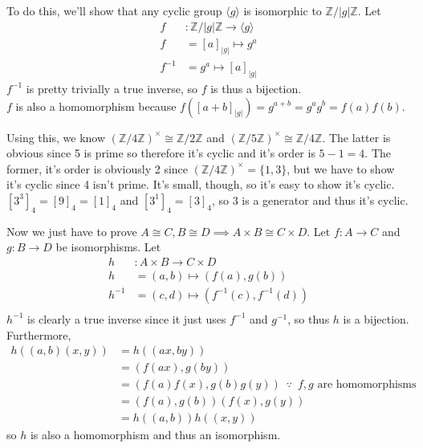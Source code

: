 \documentclass[fleqn]{article}
\begin{document}
        To do this, we'll show that any cyclic group $\langle g \rangle$ is isomorphic to $\mathbb{Z}/|g|\mathbb{Z}$.  Let
        \begin{align}
            f&: \mathbb{Z}/|g|\mathbb{Z} \to \langle g \rangle \\
            f &= [a]_{|g|} \mapsto g^a \\
            f^{-1} &= g^a \mapsto [a]_{|g|}
        \end{align}
        $f^{-1}$ is pretty trivially a true inverse, so $f$ is thus a bijection.  \\
        $f$ is also a homomorphism because $f([a + b]_{|g|}) = g^{a + b} = g^a g^b = f(a)f(b)$.  
        
        Using this, we know $(\mathbb{Z}/4\mathbb{Z})^\times \cong \mathbb{Z}/2\mathbb{Z}$ and $(\mathbb{Z}/5\mathbb{Z})^\times \cong \mathbb{Z}/4\mathbb{Z}$.  The latter is obvious since 5 is prime so therefore it's cyclic and it's order is $5 - 1 = 4$.  The former, it's order is obviously 2 since $(\mathbb{Z}/4\mathbb{Z})^\times = \{1, 3\}$, but we have to show it's cyclic since 4 isn't prime.  It's small, though, so it's easy to show it's cyclic.  $[3^3]_4 = [9]_4 = [1]_4$ and $[3^1]_4 = [3]_4$, so $3$ is a generator and thus it's cyclic.
        
        Now we just have to prove $A \cong C, B \cong D \implies A \times B \cong C \times D$.  Let $f: A \to C$ and $g: B \to D$ be isomorphisms.  Let
        \begin{align}
            h&: A \times B \to C \times D \\
            h &= (a, b) \mapsto (f(a), g(b)) \\
            h^{-1} &= (c, d) \mapsto (f^{-1}(c), f^{-1}(d)) \\
        \end{align}
        $h^{-1}$ is clearly a true inverse since it just uses $f^{-1}$ and $g^{-1}$, so thus $h$ is a bijection.  Furthermore, \begin{align}
            h((a, b)(x, y)) &= h((ax, by)) \\
            &= (f(ax), g(by)) \\
            &= (f(a)f(x), g(b)g(y)) \enspace \because{} \enspace f, g \text{ are homomorphisms}\\
            &= (f(a), g(b))(f(x), g(y)) \\
            &= h((a, b))h((x, y))
        \end{align}
        so $h$ is also a homomorphism and thus an isomorphism.
        
\end{document}
